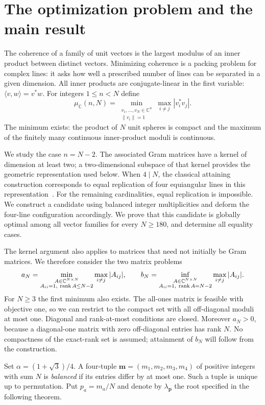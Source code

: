 \section{The optimization problem and the main result}
The coherence of a family of unit vectors is the largest modulus of an
inner product between distinct vectors. Minimizing coherence is a
packing problem for complex lines: it asks how well a prescribed number
of lines can be separated in a given dimension.
All inner products are conjugate-linear in the first variable:
$\langle v,w\rangle=v^*w$. For integers $1\leq n<N$ define
\[
 \mu_{\mathbb C}(n,N)=
 \min_{\substack{v_1,\ldots,v_N\in\mathbb C^n\\\|v_i\|=1}}
 \max_{i\ne j}|v_i^*v_j|.
\]
The minimum exists: the product of $N$ unit spheres is compact and the
maximum of the finitely many continuous inner-product moduli is continuous.

We study the case $n=N-2$. The associated Gram matrices have a kernel
of dimension at least two; a two-dimensional subspace of that kernel
provides the geometric representation used below. When $4\mid N$, the
classical attaining construction corresponds to equal replication of
four equiangular lines in this representation~\cite{BC,Glazyrin}.
For the remaining cardinalities, equal replication is impossible.
We construct a candidate using balanced integer multiplicities and
deform the four-line configuration accordingly. We prove that this
candidate is globally optimal among all vector families for every
$N\ge180$, and determine all equality cases.

The kernel argument also applies to matrices that need not initially
be Gram matrices. We therefore consider the two matrix problems
\[
 a_N=\min_{\substack{A\in\mathbb C^{N\times N}\\A_{ii}=1,\ \operatorname{rank} A\leq N-2}}
       \max_{i\ne j}|A_{ij}|,\qquad
 b_N=\inf_{\substack{A\in\mathbb C^{N\times N}\\A_{ii}=1,\ \operatorname{rank} A=N-2}}
       \max_{i\ne j}|A_{ij}|.
\]
For $N\geq3$ the first minimum also exists. The all-ones matrix is feasible
with objective one, so we can restrict to the compact set with all
off-diagonal moduli at most one. Diagonal and rank-at-most conditions are
closed. Moreover $a_N>0$, because a diagonal-one matrix with zero
off-diagonal entries has rank $N$. No compactness of the exact-rank set is
assumed; attainment of $b_N$ will follow from the construction.

Set $\alpha=(1+\sqrt3)/4$. A four-tuple
$\boldsymbol m=(m_1,m_2,m_3,m_4)$ of positive integers with sum $N$ is \emph{balanced} if its
entries differ by at most one. Such a tuple is unique up to permutation.
Put $p_a=m_a/N$ and denote by $\lambda_{\boldsymbol p}$ the root specified
in the following theorem.

